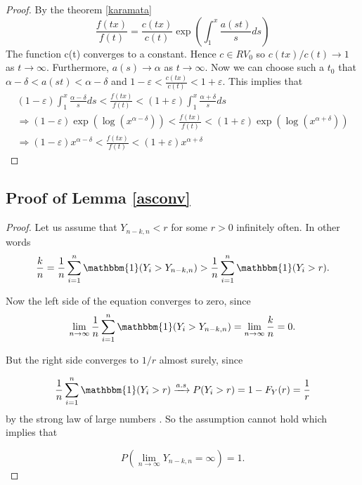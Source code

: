 \documentclass[english,12pt,a4paper,pdftex,sci,utf8]{aaltothesis} %
\begin{document}
\begin{proof}
By the theorem \ref{karamata}
\begin{equation*}
\frac{f(tx)}{f(t)}=\frac{c(tx)}{c(t)}\exp \left(\int_1^x \frac{a(st)}{s}ds \right)
\end{equation*}
The function c(t) converges to a constant. Hence $c \in RV_0$ so $c(tx)/c(t)\rightarrow 1$ as $t \rightarrow \infty$. Furthermore, $a(s) \rightarrow \alpha$ as $t \rightarrow \infty$. Now we can choose such a $t_0$ that $\alpha-\delta<a(st)<\alpha-\delta$ and $1-\varepsilon<\frac{c(tx)}{c(t)}<1+\varepsilon$. This implies that
\begin{equation*}
\begin{split}
(1-\varepsilon)\int_1^x \frac{\alpha-\delta}{s}ds<\frac{f(tx)}{f(t)}<(1+\varepsilon)\int_1^x \frac{\alpha+\delta}{s}ds \\
\Rightarrow (1-\varepsilon)\exp \left( \log \left( x^{\alpha-\delta} \right) \right)<\frac{f(tx)}{f(t)}<(1+\varepsilon)\exp \left( \log \left( x^{\alpha+\delta} \right) \right) \\
\Rightarrow (1-\varepsilon)x^{\alpha-\delta}<\frac{f(tx)}{f(t)}<(1+\varepsilon)x^{\alpha+\delta}
\end{split}
\end{equation*}
\end{proof}


\subsection{Proof of Lemma \ref{asconv}}

\begin{proof}
Let us assume that $Y_{n-k,n} < r$ for some $r > 0$ infinitely often. In other words
\begin{equation*}
\frac{k}{n} = \frac{1}{n} \sum_{i=1}^{n} \mathbbm{1}(Y_i>Y_{n-k,n}) > \frac{1}{n} \sum_{i=1}^{n} \mathbbm{1}(Y_i>r).
\end{equation*}

Now the left side of the equation converges to zero, since
\begin{equation*}
\lim_{n\to\infty} \frac{1}{n} \sum_{i=1}^{n} \mathbbm{1}(Y_i>Y_{n-k,n}) = \lim_{n\to\infty} \frac{k}{n} =0.
\end{equation*}

But the right side converges to $1/r$ almost surely, since

\begin{equation*}
\frac{1}{n} \sum_{i=1}^{n} \mathbbm{1}(Y_i>r) \xrightarrow{a.s} P(Y_i>r) = 1-F_Y(r) = \frac{1}{r}
\end{equation*}
by the strong law of large numbers \cite{rosenthal}.
So the assumption cannot hold which implies that

\begin{equation*}
P(\lim_{n\to\infty} Y_{n-k,n} = \infty)=1.
\end{equation*}
\end{proof}
\end{document}
